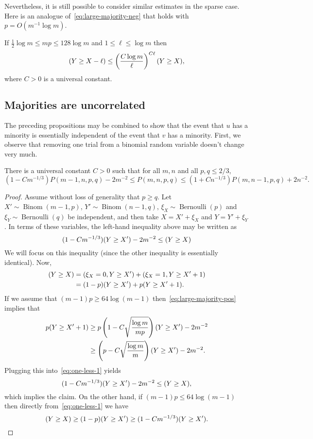 \documentclass[EJP]{ejpecp}
\newcommand{\1}[1]{\mathbbm{1}_{\{#1\}}}
\let\Pr\relax
\DeclareMathOperator{\Pr}{Pr}
\DeclareMathOperator{\Ber}{Bernoulli}
\DeclareMathOperator{\Binom}{Binom}
\begin{document}
Nevertheless, it is still possible to consider similar estimates
in the sparse case. Here is an analogue of~\eqref{eq:large-majority-neg}
that holds with $p = O(m^{-1} \log m)$.

\begin{proposition}\label{prop:large-majority-sparse}
 If $\frac 12 \log m \le mp \le 128 \log m$ and $1 \le \ell \le \log m$
 then
 \[
  \Pr(Y \ge X - \ell) \le \left(\frac{C \log m}{\ell}\right)^{C\ell}
  \Pr(Y \ge X),
 \]
 where $C > 0$ is a universal constant.
\end{proposition}

\subsection{Majorities are uncorrelated}

The preceding propositions may be combined to 
show that the event that $u$ has a minority is essentially independent
of the event that $v$ has a minority.
First, we observe that removing one trial from a binomial random
variable doesn't change very much.

\begin{lemma}\label{lem:one-less}
  There is a universal constant $C > 0$ such that for all
  $m, n$ and all $p, q \le 2/3$,
  \[
  (1 - C m^{-1/3}) P(m-1, n, p, q) - 2m^{-2}
    \le P(m, n, p, q)
    \le (1 + C n^{-1/3}) P(m, n-1, p, q) + 2n^{-2}.
  \]
\end{lemma}

\begin{proof}
  Assume without loss of generality that $p \ge q$.
  Let $X' \sim \Binom(m-1, p)$, $Y' \sim \Binom(n-1, q)$,
  $\xi_X \sim \Ber(p)$ and $\xi_Y \sim \Ber(q)$ be independent,
  and then take $X = X' + \xi_X$ and $Y = Y' + \xi_Y$. In terms
  of these variables, the left-hand inequality above may be written 
  as
  \[
  (1- C m^{-1/3}) \Pr(Y \ge X') - 2m^{-2} \le \Pr(Y \ge X)
  \]
  We will focus on this inequality (since the other inequality
  is essentially identical). Now,
 \begin{align}
  \Pr(Y \ge X) &= \Pr(\xi_X = 0, Y \ge X') + \Pr(\xi_X = 1, Y \ge X' + 1) \notag \\
  &= (1-p) \Pr(Y \ge X') + p \Pr(Y \ge X' + 1).
  \label{eq:one-less-1}
 \end{align}
 If we assume that $(m-1)p \ge 64 \log (m-1)$
 then~\eqref{eq:large-majority-pos} implies that
 \begin{align*}
  p \Pr(Y \ge X' + 1)
  &\ge p\left(1 - C \sqrt\frac{\log m}{mp}\right) \Pr(Y \ge X') - 2m^{-2}\\
  &\ge \left(p - C \sqrt\frac{\log m}{m}\right) \Pr(Y \ge X') - 2m^{-2}.
 \end{align*}
 Plugging this into~\eqref{eq:one-less-1} yields
 \[
 (1 - C m^{-1/3}) \Pr(Y \ge X') - 2m^{-2} \le \Pr(Y \ge X),
 \]
 which implies the claim. On the other hand, if $(m-1)p \le 64 \log (m-1)$ then
 directly from~\eqref{eq:one-less-1} we have
 \[
  \Pr(Y \ge X) \ge (1-p) \Pr(Y \ge X') \ge (1 - C m^{-1/3}) \Pr(Y \ge X').
  \qedhere
 \]
\end{proof}
\end{document}
